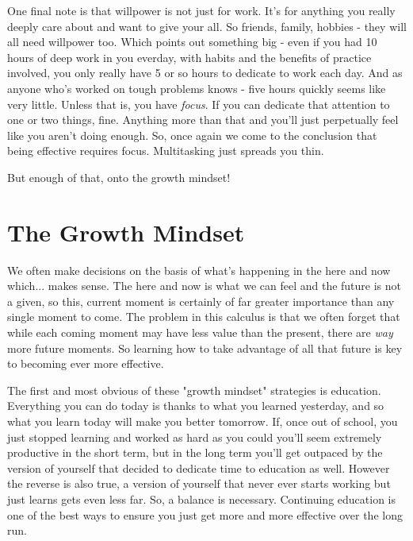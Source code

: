 \documentclass[11pt,a5paper]{book}
\begin{document}
One final note is that willpower is not just for work. It's for anything you really deeply care about and want to give your all. So friends, family, hobbies - they will all need willpower too. Which points out something big - even if you had 10 hours of deep work in you everday, with habits and the benefits of practice involved, you only really have 5 or so hours to dedicate to work each day. And as anyone who's worked on tough problems knows - five hours quickly seems like very little. Unless that is, you have \textit{focus}. If you can dedicate that attention to one or two things, fine. Anything more than that and you'll just perpetually feel like you aren't doing enough. So, once again we come to the conclusion that being effective requires focus. Multitasking just spreads you thin.
\newline

But enough of that, onto the growth mindset!

\section{The Growth Mindset}
We often make decisions on the basis of what's happening in the here and now which... makes sense. The here and now is what we can feel and the future is not a given, so this, current moment is certainly of far greater importance than any single moment to come. The problem in this calculus is that we often forget that while each coming moment may have less value than the present, there are \textit{way} more future moments. So learning how to take advantage of all that future is key to becoming ever more effective.
\newline

The first and most obvious of these "growth mindset" strategies is education. Everything you can do today is thanks to what you learned yesterday, and so what you learn today will make you better tomorrow. If, once out of school, you just stopped learning and worked as hard as you could you'll seem extremely productive in the short term, but in the long term you'll get outpaced by the version of yourself that decided to dedicate time to education as well. However the reverse is also true, a version of yourself that never ever starts working but just learns gets even less far. So, a balance is necessary. Continuing education is one of the best ways to ensure you just get more and more effective over the long run. 
\newline
\end{document}
